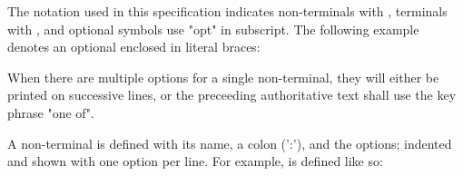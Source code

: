

\specsubitem
The notation used in this specification indicates non-terminals with
, terminals with , and optional
symbols use "opt" in subscript. The following example denotes an optional
 enclosed in literal braces:

\begin{grammar}
\terminal{\{}  \terminal{\}}
\end{grammar}

\specsubitem
When there are multiple options for a single non-terminal, they will either be
printed on successive lines, or the preceeding authoritative text shall use the
key phrase "one of".

\specsubitem
A non-terminal is defined with its name, a colon (':'), and the options;
indented and shown with one option per line. For example,
 is defined like so:

\begin{grammar}
\\
 \terminal{,}\\
 \terminal{,} 
\end{grammar}
